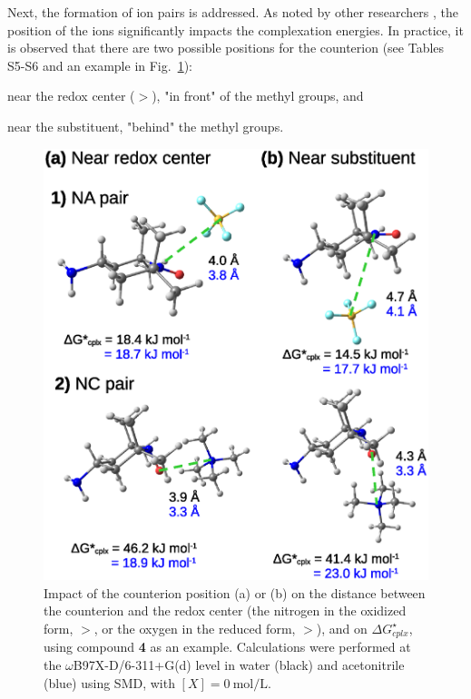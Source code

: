\documentclass[review,preprint]{elsarticle}
\begin{document}
\clearpage

Next, the formation of ion pairs is addressed. As noted by other researchers \cite{zhangInteractionsImidazoliumBasedIonic2016,wylieImprovedPerformanceAllOrganic2019a}, the position of the ions significantly impacts the complexation energies. In practice, it is observed that there are two possible positions for the counterion (see Tables S5-S6 and an example in Fig.~\ref{fig:pos-anion}):
\begin{inparaenum}[(i)]
	\item near the redox center ($>$), "in front" of the methyl groups, and
	\item near the substituent, "behind" the methyl groups.
\end{inparaenum}

\begin{figure}[!h]
\centering
\includegraphics[width=.8\linewidth]{Figure12}
\caption{Impact of the counterion position (a) or (b) on the distance between the counterion and the redox center (the nitrogen in the oxidized form, $>$, or the oxygen in the reduced form, $>$), and on $\Delta G^\star_{cplx}$, using compound \textbf{4} as an example. Calculations were performed at the $\omega$B97X-D/6-311+G(d) level in water (black) and acetonitrile (blue) using SMD, with $[X]=\SI{0}{\mole\per\liter}$.}
\label{fig:pos-anion}
\end{figure}
\end{document}
